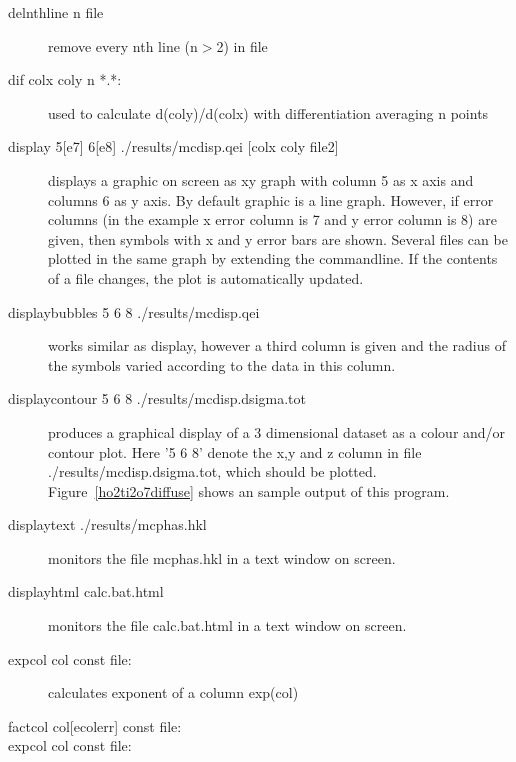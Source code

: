 \begin{description}
\item [\prg delnthline n file]  remove every nth line (n$>$2) in file
\item [\prg dif colx coly n *.*:] used to calculate d(coly)/d(colx) with %
differentiation averaging n points
\item [\prg display 5{[e7]} 6{[e8]}  ./results/mcdisp.qei {[colx coly file2]}] displays a graphic on screen as xy %
graph
with column 5 as x axis and columns 6 as y axis. By default graphic is a line graph.
However, if error columns (in the example x error column is 7 and y error column is 8)
are given, then symbols with x and y error bars are shown. Several files
can be plotted in the same graph by extending the commandline. If the contents of a file
changes, the plot is automatically updated.
\item [\prg displaybubbles  5 6 8 ./results/mcdisp.qei] works similar as %
display, however
a third column is given and the radius of the symbols varied according to the data in 
this column.
\item [\prg displaycontour 5 6 8 ./results/mcdisp.dsigma.tot] produces a %
graphical
display of a 3 dimensional dataset as a colour and/or contour plot. Here '5 6 8' 
denote the x,y and z column in file {\prg ./results/mcdisp.dsigma.tot}, which should
be plotted. Figure~\ref{ho2ti2o7diffuse} shows an sample output of this program.
\item [\prg displaytext ./results/mcphas.hkl] monitors the file mcphas.hkl in %
a text window on screen.
\item [\prg displayhtml calc.bat.html] monitors the file calc.bat.html in 
a text window on screen.
\item [\prg expcol col const file:] calculates exponent of a column exp(col) 
\item [\prg factcol col{[ecolerr]} const file:]\item [\prg expcol col const file:]

\end{description}
